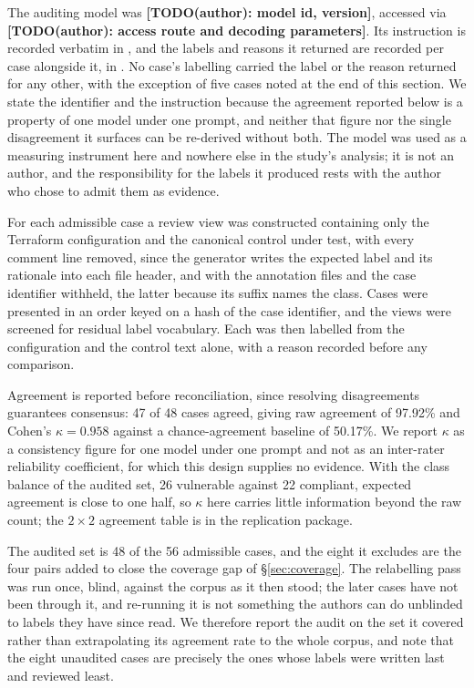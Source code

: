\documentclass[smallextended]{svjour3}
\newcommand{\ratermodel}{\textbf{[TODO(author): model id, version]}}
\newcommand{\rateraccess}{\textbf{[TODO(author): access route and decoding
  parameters]}}
\begin{document}
The auditing model was \ratermodel, accessed via \rateraccess. Its instruction is
recorded verbatim in , and the labels
and reasons it returned are recorded per case alongside it, in
. No case's labelling carried the label or the
reason returned for any other, with the exception of five cases noted at the end
of this section. We state the identifier
and the instruction because the agreement reported below is a property of one
model under one prompt, and neither that figure nor the single disagreement it
surfaces can be re-derived without both. The model was used as a measuring
instrument here and nowhere else in the study's analysis; it is not an author, and
the responsibility for the labels it produced rests with the author who chose to
admit them as evidence.

For each admissible case a review view was constructed containing only the
Terraform configuration and the canonical control under test, with every comment
line removed, since the generator writes the expected label and its rationale
into each file header, and with the annotation files and the case identifier
withheld, the latter because its suffix names the class. Cases were presented in
an order keyed on a hash of the case identifier, and the views were screened for
residual label vocabulary. Each was then labelled from the configuration and the
control text alone, with a reason recorded before any comparison.

Agreement is reported before reconciliation, since resolving disagreements
guarantees consensus: 47 of 48 cases agreed, giving raw agreement of 97.92\% and
Cohen's $\kappa = 0.958$ against a chance-agreement baseline of 50.17\%. We report
$\kappa$ as a consistency figure for one model under one prompt and not as an
inter-rater reliability coefficient, for which this design supplies no evidence. With
the class balance of the audited set, 26 vulnerable against 22 compliant, expected
agreement is close to one half, so $\kappa$ here carries little information beyond
the raw count; the $2 \times 2$ agreement table is in the replication package.

The audited set is 48 of the 56 admissible cases, and the eight it excludes are
the four pairs added to close the coverage gap of \S\ref{sec:coverage}. The
relabelling pass was run once, blind, against the corpus as it then stood; the
later cases have not been through it, and re-running it is not something the
authors can do unblinded to labels they have since read. We therefore report the
audit on the set it covered rather than extrapolating its agreement rate to the
whole corpus, and note that the eight unaudited cases are precisely the ones whose
labels were written last and reviewed least.
\end{document}
